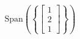 \documentclass[preview]{standalone}
\begin{document}
\begin{align*}
\text{Span}\left(\left\{\begin{bmatrix} 1 \\ 2 \\ 1 \end{bmatrix}\right\}\right)
\end{align*}
\end{document}
